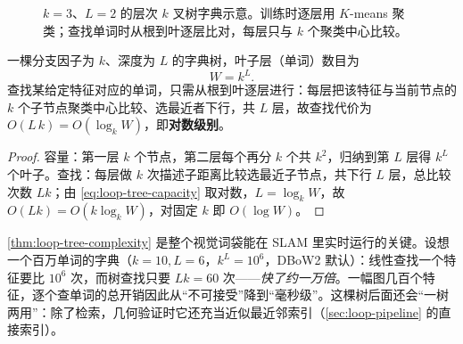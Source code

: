 \begin{figure}[ht]
\centering
{}
\caption{$k=3$、$L=2$ 的层次 $k$ 叉树字典示意。训练时逐层用 $K$-means 聚类；查找单词时从根到叶逐层比对，每层只与 $k$ 个聚类中心比较。}
\label{fig:loop-ktree}
\end{figure}

\begin{theorem}[$k$ 叉树字典的容量与查找复杂度]\label{thm:loop-tree-complexity}
一棵分支因子为 $k$、深度为 $L$ 的字典树，叶子层（单词）数目为
\begin{equation}
  W = k^{L}.
  \label{eq:loop-tree-capacity}
\end{equation}
查找某给定特征对应的单词，只需从根到叶逐层进行：每层把该特征与当前节点的 $k$ 个子节点聚类中心比较、选最近者下行，共 $L$ 层，故查找代价为 $O(L\,k)=O(\log_k W)$，即\textbf{对数级别}。
\end{theorem}
\begin{proof}
容量：第一层 $k$ 个节点，第二层每个再分 $k$ 个共 $k^2$，归纳到第 $L$ 层得 $k^L$ 个叶子。查找：每层做 $k$ 次描述子距离比较选最近子节点，共下行 $L$ 层，总比较次数 $Lk$；由 \cref{eq:loop-tree-capacity} 取对数，$L=\log_k W$，故 $O(Lk)=O(k\log_k W)$，对固定 $k$ 即 $O(\log W)$。
\end{proof}

\begin{insight}[对数查找是词袋能实时的根基]\label{ins:loop-logsearch}
\cref{thm:loop-tree-complexity} 是整个视觉词袋能在 SLAM 里实时运行的关键。设想一个百万单词的字典（$k=10,L=6$，$k^L=10^6$，DBoW2 默认\cite{galvez2012bags}）：线性查找一个特征要比 $10^6$ 次，而树查找只要 $Lk=60$ 次——\emph{快了约一万倍}。一幅图几百个特征，逐个查单词的总开销因此从“不可接受”降到“毫秒级”。这棵树后面还会“一树两用”：除了检索，几何验证时它还充当近似最近邻索引（\cref{sec:loop-pipeline} 的直接索引）。
\end{insight}

